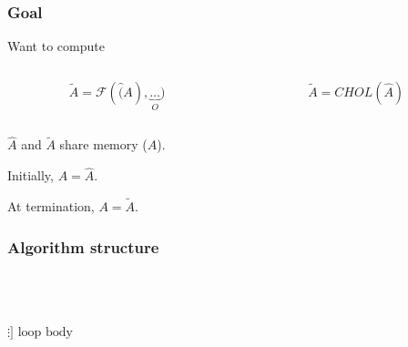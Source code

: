 \documentclass{beamer}
\newcommand*{\opF}{\mathcal{F}}
\def\?#1{}
\begin{document}
\begin{frame}
  \frametitle{Goal}
  Want to compute
  \begin{columns}
    \begin{column}{0.5\textwidth}
      \begin{equation*}
        \widetilde{A} = \opF(\hat(A), \underbrace{\ldots}_{O})
      \end{equation*}
    \end{column}
    \begin{column}{0.5\textwidth}
      \begin{equation*}
        \widetilde{A} = CHOL(\hat{A})
      \end{equation*}
    \end{column}
  \end{columns}

  $\hat{A}$ and $\widetilde{A}$ share memory ($A$).

  Initially, $A = \hat{A}$.

  At termination, $A = \widetilde{A}$.
\end{frame}

\begin{frame}
  \frametitle{Algorithm structure}
  \begin{FlameAlg}
    \\
    \\
    \\
    $\?[\vdots]\text{ loop body}$\\ %
    \\
    \FlaEndDo{}
  \end{FlameAlg}
\end{frame}
\end{document}
